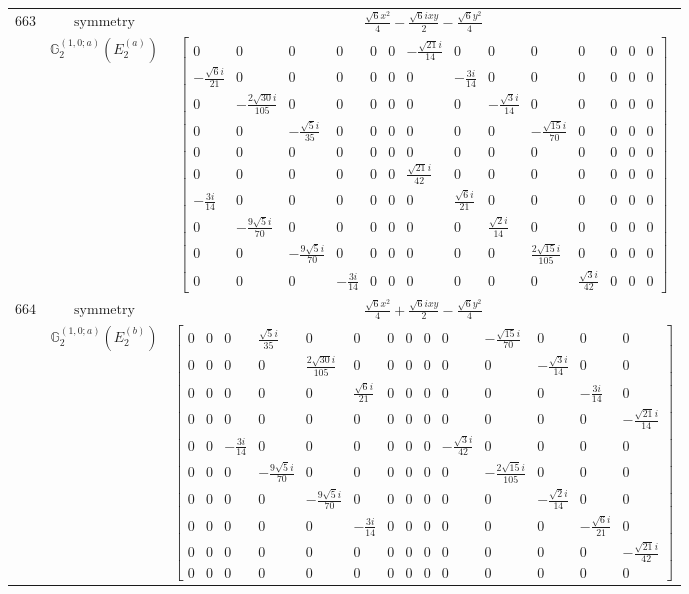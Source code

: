\documentclass[fleqn,8pt,landscape]{jsarticle}
\begin{document}
\begin{longtable}{ccc}
$ 663 $ & $ \text{symmetry} $ & $ \frac{\sqrt{6} x^{2}}{4} - \frac{\sqrt{6} i x y}{2} - \frac{\sqrt{6} y^{2}}{4} $ \\
$  $ & $ \mathbb{G}_{2}^{(1,0;a)}(E_{2}^{(a)}) $ & $ \begin{bmatrix} 0 & 0 & 0 & 0 & 0 & 0 & - \frac{\sqrt{21} i}{14} & 0 & 0 & 0 & 0 & 0 & 0 & 0 \\ - \frac{\sqrt{6} i}{21} & 0 & 0 & 0 & 0 & 0 & 0 & - \frac{3 i}{14} & 0 & 0 & 0 & 0 & 0 & 0 \\ 0 & - \frac{2 \sqrt{30} i}{105} & 0 & 0 & 0 & 0 & 0 & 0 & - \frac{\sqrt{3} i}{14} & 0 & 0 & 0 & 0 & 0 \\ 0 & 0 & - \frac{\sqrt{5} i}{35} & 0 & 0 & 0 & 0 & 0 & 0 & - \frac{\sqrt{15} i}{70} & 0 & 0 & 0 & 0 \\ 0 & 0 & 0 & 0 & 0 & 0 & 0 & 0 & 0 & 0 & 0 & 0 & 0 & 0 \\ 0 & 0 & 0 & 0 & 0 & 0 & \frac{\sqrt{21} i}{42} & 0 & 0 & 0 & 0 & 0 & 0 & 0 \\ - \frac{3 i}{14} & 0 & 0 & 0 & 0 & 0 & 0 & \frac{\sqrt{6} i}{21} & 0 & 0 & 0 & 0 & 0 & 0 \\ 0 & - \frac{9 \sqrt{5} i}{70} & 0 & 0 & 0 & 0 & 0 & 0 & \frac{\sqrt{2} i}{14} & 0 & 0 & 0 & 0 & 0 \\ 0 & 0 & - \frac{9 \sqrt{5} i}{70} & 0 & 0 & 0 & 0 & 0 & 0 & \frac{2 \sqrt{15} i}{105} & 0 & 0 & 0 & 0 \\ 0 & 0 & 0 & - \frac{3 i}{14} & 0 & 0 & 0 & 0 & 0 & 0 & \frac{\sqrt{3} i}{42} & 0 & 0 & 0 \end{bmatrix} $ \\ \hline
$ 664 $ & $ \text{symmetry} $ & $ \frac{\sqrt{6} x^{2}}{4} + \frac{\sqrt{6} i x y}{2} - \frac{\sqrt{6} y^{2}}{4} $ \\
$  $ & $ \mathbb{G}_{2}^{(1,0;a)}(E_{2}^{(b)}) $ & $ \begin{bmatrix} 0 & 0 & 0 & \frac{\sqrt{5} i}{35} & 0 & 0 & 0 & 0 & 0 & 0 & - \frac{\sqrt{15} i}{70} & 0 & 0 & 0 \\ 0 & 0 & 0 & 0 & \frac{2 \sqrt{30} i}{105} & 0 & 0 & 0 & 0 & 0 & 0 & - \frac{\sqrt{3} i}{14} & 0 & 0 \\ 0 & 0 & 0 & 0 & 0 & \frac{\sqrt{6} i}{21} & 0 & 0 & 0 & 0 & 0 & 0 & - \frac{3 i}{14} & 0 \\ 0 & 0 & 0 & 0 & 0 & 0 & 0 & 0 & 0 & 0 & 0 & 0 & 0 & - \frac{\sqrt{21} i}{14} \\ 0 & 0 & - \frac{3 i}{14} & 0 & 0 & 0 & 0 & 0 & 0 & - \frac{\sqrt{3} i}{42} & 0 & 0 & 0 & 0 \\ 0 & 0 & 0 & - \frac{9 \sqrt{5} i}{70} & 0 & 0 & 0 & 0 & 0 & 0 & - \frac{2 \sqrt{15} i}{105} & 0 & 0 & 0 \\ 0 & 0 & 0 & 0 & - \frac{9 \sqrt{5} i}{70} & 0 & 0 & 0 & 0 & 0 & 0 & - \frac{\sqrt{2} i}{14} & 0 & 0 \\ 0 & 0 & 0 & 0 & 0 & - \frac{3 i}{14} & 0 & 0 & 0 & 0 & 0 & 0 & - \frac{\sqrt{6} i}{21} & 0 \\ 0 & 0 & 0 & 0 & 0 & 0 & 0 & 0 & 0 & 0 & 0 & 0 & 0 & - \frac{\sqrt{21} i}{42} \\ 0 & 0 & 0 & 0 & 0 & 0 & 0 & 0 & 0 & 0 & 0 & 0 & 0 & 0 \end{bmatrix} $ \\ \hline

\end{longtable}
\end{document}
